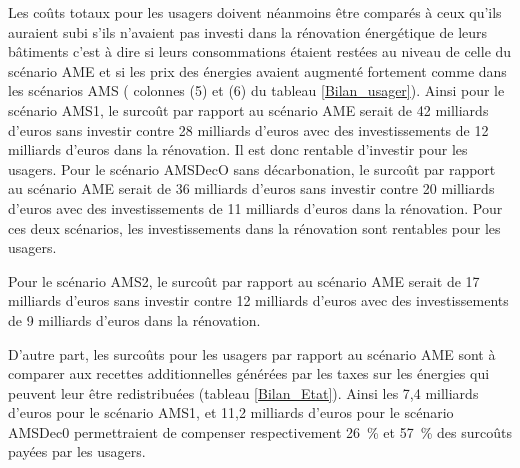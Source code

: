 \documentclass[10.5pt,a4paper]{article}
\newcommand\cadrevert[3]{
\begin{encadre}

\color{vert_n} \fontsize{14}{13}\selectfont Zoom sur : \color{black} \fontsize{14}{13}\selectfont #1
\vspace{4mm}


\fontsize{9}{10}\selectfont #2

{\setlength{\parindent}{5mm}%
\fontsize{9}{10}\selectfont #3
}
\end{encadre}
}
\begin{document}
{Les coûts totaux pour les usagers doivent néanmoins être comparés à ceux qu'ils auraient subi s'ils n'avaient pas investi dans la rénovation énergétique de leurs bâtiments c'est à dire si leurs consommations étaient restées au niveau de celle du scénario AME et si les prix des énergies avaient augmenté fortement comme dans les scénarios AMS ( colonnes (5) et (6) du tableau \ref{Bilan_usager}). Ainsi pour le scénario AMS1, le surcoût par rapport au scénario AME serait de 42 milliards d'euros sans investir contre 28 milliards d'euros avec des investissements de 12 milliards d'euros dans la rénovation. Il est donc rentable d'investir pour les usagers. Pour le scénario AMSDecO sans décarbonation, le surcoût par rapport au scénario AME serait de 36 milliards d'euros sans investir contre 20 milliards d'euros avec des investissements de 11 milliards d'euros dans la rénovation. Pour ces deux scénarios, les investissements dans la rénovation sont rentables pour les usagers. 

Pour le scénario AMS2, le surcoût par rapport au scénario AME serait de 17 milliards d'euros sans investir contre 12 milliards d'euros avec des investissements de 9 milliards d'euros dans la rénovation. 

D'autre part, les surcoûts pour les usagers par rapport au scénario AME sont à comparer aux recettes additionnelles générées par les taxes sur les énergies qui peuvent leur être redistribuées (tableau \ref{Bilan_Etat}). Ainsi les 7,4 milliards d'euros pour le scénario AMS1, et 11,2 milliards d'euros pour le scénario AMSDec0 permettraient de compenser respectivement 26~\% et 57~\% des surcoûts payées par les usagers.


\newpage 
\clearpage 


}
\end{document}
